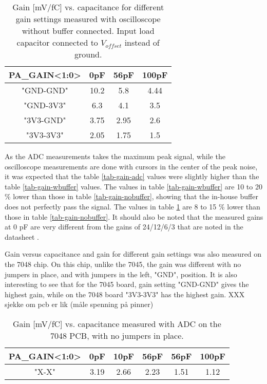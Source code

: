 \documentclass[../main/thesis.tex]{subfiles}
\begin{document}
\begin{table}[h!]
	\begin{center}
		\caption{Gain [mV/fC] vs. capacitance for different gain settings measured with oscilloscope without buffer connected. Input load capacitor connected to $V_{offset}$ instead of ground.}
		\label{tab-gain-nobuffer-offset}
		\begin{tabular}{cccc}\toprule
			\textbf{PA\_GAIN<1:0>} & \textbf{0pF}  & \textbf{56pF} & \textbf{100pF} \\ \midrule
			"GND-GND"     & 10.2 & 5.8  & 4.44  \\
			"GND-3V3"     & 6.3  & 4.1  & 3.5   \\
			"3V3-GND"     & 3.75 & 2.95 & 2.6   \\
			"3V3-3V3"     & 2.05 & 1.75 & 1.5   \\ \bottomrule
		\end{tabular}
	\end{center}
\end{table}

As the ADC measurements takes the maximum peak signal, while the oscilloscope measurements are done with cursors in the center of the peak noise, it was expected that the table \ref{tab-gain-adc} values were slightly higher than the table \ref{tab-gain-wbuffer} values. The values in table \ref{tab-gain-wbuffer} are 10 to 20 \% lower than those in table \ref{tab-gain-nobuffer}, showing that the in-house buffer does not perfectly pass the signal. The values in table \ref{tab-gain-nobuffer-offset} are 8 to 15 \% lower than those in table \ref{tab-gain-nobuffer}. It should also be noted that the measured gains at 0 pF are very different from the gains of 24/12/6/3 that are noted in the datasheet \citep{IDE1180}.

Gain versus capacitance and gain for different gain settings was also measured on the 7048 chip. On this chip, unlike the 7045, the gain was different with no jumpers in place, and with jumpers in the left, "GND", position. It is also interesting to see that for the 7045 board, gain setting "GND-GND" gives the highest gain, while on the 7048 board "3V3-3V3" has the highest gain. XXX sjekke om pcb er lik (måle spenning på pinner)

\begin{table}[h!]
	\begin{center}
		\caption{Gain [mV/fC] vs. capacitance measured with ADC on the 7048 PCB, with no jumpers in place.}
		\label{tab-gain-adc-7048}
		\begin{tabular}{cccccc}\toprule
			\textbf{PA\_GAIN<1:0>} & \textbf{0pF}  & \textbf{10pF} & \textbf{56pF} & \textbf{56pF} & \textbf{100pF} \\ \midrule
			"X-X"     & 3.19 & 2.66  & 2.23  & 1.51 & 1.12   \\ \bottomrule
		\end{tabular}
	\end{center}
\end{table}
\end{document}
